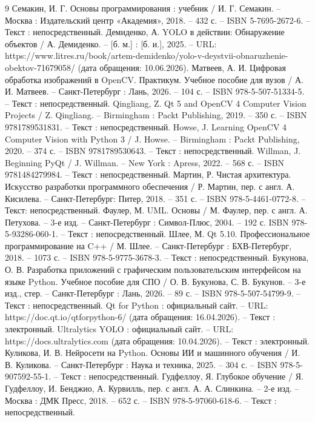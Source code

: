\begin{thebibliography}{9}
	 Семакин, И. Г. Основы программирования : учебник / И. Г. Семакин. -- Москва : Издательский центр «Академия», 2018. -- 432 с. -- ISBN 5-7695-2672-6. -- Текст : непосредственный.
	 Демиденко, А. YOLO в действии: Обнаружение объектов / А. Демиденко. -- [б. м.] : [б. и.], 2025. -- URL: https://www.litres.ru/book/artem-demidenko/yolo-v-deystvii-obnaruzhenie-obektov-71679058/ (дата обращения: 10.06.2026).
	 Матвеев, А. И. Цифровая обработка изображений в OpenCV. Практикум. Учебное пособие для вузов / А. И. Матвеев. -- Санкт-Петербург : Лань, 2026. -- 104 с. -- ISBN 978-5-507-51334-5. -- Текст : непосредственный.
	 Qingliang, Z. Qt 5 and OpenCV 4 Computer Vision Projects / Z. Qingliang. -- Birmingham : Packt Publishing, 2019. -- 350 с. -- ISBN 9781789531831. -- Текст : непосредственный.
	 Howse, J. Learning OpenCV 4 Computer Vision with Python 3 / J. Howse. -- Birmingham : Packt Publishing, 2020. -- 374 с. -- ISBN 9781789530643. -- Текст : непосредственный.
	 Willman, J. Beginning PyQt / J. Willman. -- New York : Apress, 2022. -- 568 с. -- ISBN 9781484279984. -- Текст : непосредственный.
	 Мартин, Р. Чистая архитектура. Искусство разработки программного обеспечения / Р. Мартин, пер. с англ. А. Кисилева. -- Санкт-Петербург: Питер,	2018. -- 351 с. -- ISBN 978-5-4461-0772-8. -- Текст: непосредственный.
	 Фаулер, М. UML. Основы / М. Фаулер, пер. с англ. А. Петухова. -- 3-е изд. -- Санкт-Петербург : Символ-Плюс, 2004. -- 192 с. ISBN 978-5-93286-060-1. -- Текст : непосредственный.
	 Шлее, М. Qt 5.10. Профессиональное программирование на C++ / М. Шлее. -- Санкт-Петербург : БХВ-Петербург, 2018. -- 1073 с. -- ISBN 978-5-9775-3678-3. -- Текст : непосредственный.
	 Букунова, О. В. Разработка приложений с графическим пользовательским интерфейсом на языке Python. Учебное пособие для СПО / О. В. Букунова, С. В. Букунов. -- 3-е изд., стер. -- Санкт-Петербург : Лань, 2026. -- 89 с. -- ISBN 978-5-507-54799-9. -- Текст : непосредственный.
	 Qt for Python : официальный сайт. -- URL: https://doc.qt.io/qtforpython-6/ (дата обращения: 16.04.2026). -- Текст : электронный.
	 Ultralytics YOLO : официальный сайт. -- URL: https://docs.ultralytics.com (дата обращения: 10.04.2026). -- Текст : электронный.
	 Куликова, И. В. Нейросети на Python. Основы ИИ и машинного обучения / И. В. Куликова. -- Санкт-Петербург : Наука и техника, 2025. -- 304 с. -- ISBN 978-5-907592-55-1. -- Текст : непосредственный.
	 Гудфеллоу, Я. Глубокое обучение / Я. Гудфеллоу, И. Бенджио, А. Курвилль, пер. с англ. А. А. Слинкина. -- 2-е изд. -- Москва : ДМК Пресс, 2018. -- 652 с. -- ISBN 978-5-97060-618-6. -- Текст : непосредственный.

\end{thebibliography}
